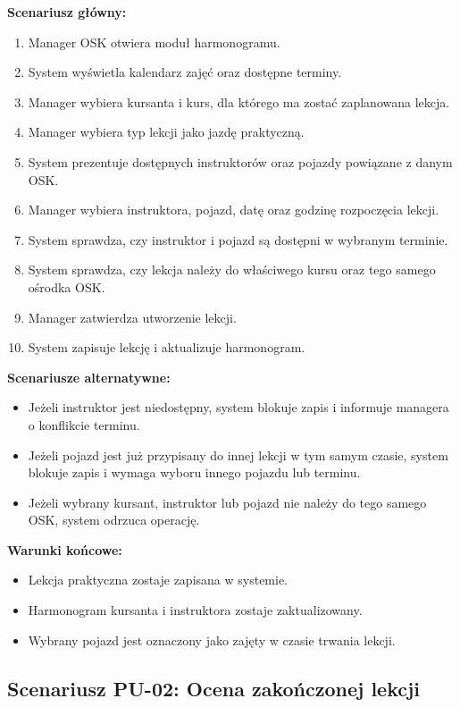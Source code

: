 \noindent\textbf{Scenariusz główny:}
\begin{enumerate}
    \item Manager OSK otwiera moduł harmonogramu.
    \item System wyświetla kalendarz zajęć oraz dostępne terminy.
    \item Manager wybiera kursanta i kurs, dla którego ma zostać zaplanowana lekcja.
    \item Manager wybiera typ lekcji jako jazdę praktyczną.
    \item System prezentuje dostępnych instruktorów oraz pojazdy powiązane z danym OSK.
    \item Manager wybiera instruktora, pojazd, datę oraz godzinę rozpoczęcia lekcji.
    \item System sprawdza, czy instruktor i pojazd są dostępni w wybranym terminie.
    \item System sprawdza, czy lekcja należy do właściwego kursu oraz tego samego ośrodka OSK.
    \item Manager zatwierdza utworzenie lekcji.
    \item System zapisuje lekcję i aktualizuje harmonogram.
\end{enumerate}

\noindent\textbf{Scenariusze alternatywne:}
\begin{itemize}
    \item Jeżeli instruktor jest niedostępny, system blokuje zapis i informuje managera o konflikcie terminu.
    \item Jeżeli pojazd jest już przypisany do innej lekcji w tym samym czasie, system blokuje zapis i wymaga wyboru innego pojazdu lub terminu.
    \item Jeżeli wybrany kursant, instruktor lub pojazd nie należy do tego samego OSK, system odrzuca operację.
\end{itemize}

\noindent\textbf{Warunki końcowe:}
\begin{itemize}
    \item Lekcja praktyczna zostaje zapisana w systemie.
    \item Harmonogram kursanta i instruktora zostaje zaktualizowany.
    \item Wybrany pojazd jest oznaczony jako zajęty w czasie trwania lekcji.
\end{itemize}

\subsection{Scenariusz PU-02: Ocena zakończonej lekcji}
\label{subsec:pu-ocena-zakonczonej-lekcji}

